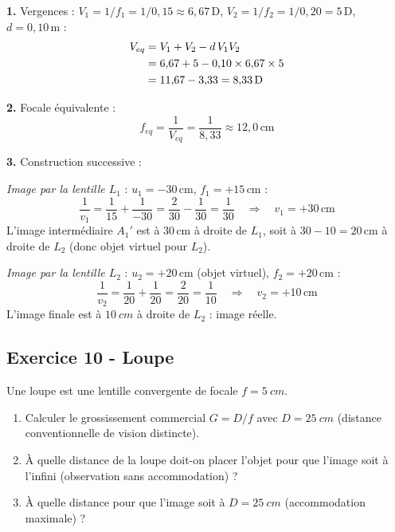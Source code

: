 \documentclass[12pt,a4paper]{article}
\begin{document}
\begin{boitecorrige}
\textbf{1.} Vergences : $V_1 = 1/f_1 = 1/0{,}15 \approx 6{,}67\,\text{D}$, $V_2 = 1/f_2 = 1/0{,}20 = 5\,\text{D}$, $d = 0{,}10\,\text{m}$ :
\begin{align}
V_{eq} &= V_1 + V_2 - d\,V_1 V_2 \notag \\
&= 6{,}67 + 5 - 0{,}10 \times 6{,}67 \times 5 \notag \\
&= 11{,}67 - 3{,}33 = 8{,}33\,\text{D}
\end{align}

\textbf{2.} Focale équivalente :
\[
f_{eq} = \frac{1}{V_{eq}} = \frac{1}{8{,}33} \approx 12{,}0\,\text{cm}
\]

\textbf{3.} Construction successive :

\textit{Image par la lentille $L_1$} : $u_1 = -30\,\text{cm}$, $f_1 = +15\,\text{cm}$ :
\[
\frac{1}{v_1} = \frac{1}{15} + \frac{1}{-30} = \frac{2}{30} - \frac{1}{30} = \frac{1}{30} \quad \Rightarrow \quad v_1 = +30\,\text{cm}
\]
L'image intermédiaire $A_1'$ est à $30\,\text{cm}$ à droite de $L_1$, soit à $30 - 10 = 20\,\text{cm}$ à droite de $L_2$ (donc objet virtuel pour $L_2$).

\textit{Image par la lentille $L_2$} : $u_2 = +20\,\text{cm}$ (objet virtuel), $f_2 = +20\,\text{cm}$ :
\[
\frac{1}{v_2} = \frac{1}{20} + \frac{1}{20} = \frac{2}{20} = \frac{1}{10} \quad \Rightarrow \quad v_2 = +10\,\text{cm}
\]
L'image finale est à $\qty{10}{cm}$ à droite de $L_2$ : image réelle.
\end{boitecorrige}

\subsection*{Exercice 10 - Loupe \niveau{\facile}}

\begin{boiteexercice}
Une loupe est une lentille convergente de focale $f = \qty{5}{cm}$.
\begin{enumerate}
  \item Calculer le grossissement commercial $G = D/f$ avec $D = \qty{25}{cm}$ (distance conventionnelle de vision distincte).
  \item À quelle distance de la loupe doit-on placer l'objet pour que l'image soit à l'infini (observation sans accommodation) ?
  \item À quelle distance pour que l'image soit à $D = \qty{25}{cm}$ (accommodation maximale) ?
\end{enumerate}
\end{boiteexercice}
\end{document}
